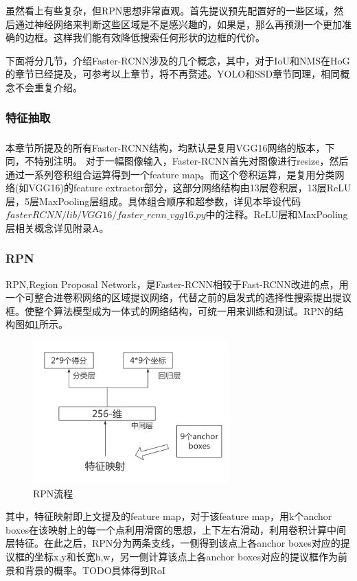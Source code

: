 \documentclass[12pt,a4paper,titlepage]{article}
\newcommand{\upcite}[1]{\textsuperscript{\textsuperscript{\cite{#1}}}}  %
\begin{document}
虽然看上有些复杂，但RPN思想非常直观。首先提议预先配置好的一些区域，然后通过神经网络来判断这些区域是不是感兴趣的，如果是，那么再预测一个更加准确的边框。这样我们能有效降低搜索任何形状的边框的代价。\par
下面将分几节，介绍Faster-RCNN涉及的几个概念，其中，对于IoU和NMS在HoG的章节已经提及，可参考以上章节，将不再赘述。YOLO和SSD章节同理，相同概念不会重复介绍。

\subsubsection{特征抽取}
本章节所提及的所有Faster-RCNN结构，均默认是复用VGG16\upcite{simonyan2014very}网络的版本，下同，不特别注明。
对于一幅图像输入，Faster-RCNN首先对图像进行resize，然后通过一系列卷积组合运算得到一个feature map。而这个卷积运算，是复用分类网络(如VGG16)的feature extractor部分，这部分网络结构由13层卷积层，13层ReLU层，5层MaxPooling层组成。具体组合顺序和超参数，详见本毕设代码$fasterRCNN/lib/VGG16/faster\_rcnn\_vgg16.py$中的注释。ReLU层和MaxPooling层相关概念详见附录A。

\subsubsection{RPN}
RPN,Region Proposal Network，是Faster-RCNN相较于Fast-RCNN改进的点，用一个可整合进卷积网络的区域提议网络，代替之前的启发式的选择性搜索提出提议框。使整个算法模型成为一体式的网络结构，可统一用来训练和测试。RPN的结构图如\ref{fig:rpn}所示。

\begin{figure}[h]
\centering
\includegraphics[height=5.5cm]{img/rpn.png}
\caption{RPN流程}
\label{fig:rpn}
\end{figure}
\par

其中，特征映射即上文提及的feature map，对于该feature map，用k个anchor boxes在该映射上的每一个点利用滑窗的思想，上下左右滑动，利用卷积计算中间层特征。在此之后，RPN分为两条支线，一侧得到该点上各anchor boxes对应的提议框的坐标x,y和长宽h,w，另一侧计算该点上各anchor boxes对应的提议框作为前景和背景的概率。TODO具体得到RoI
\end{document}
